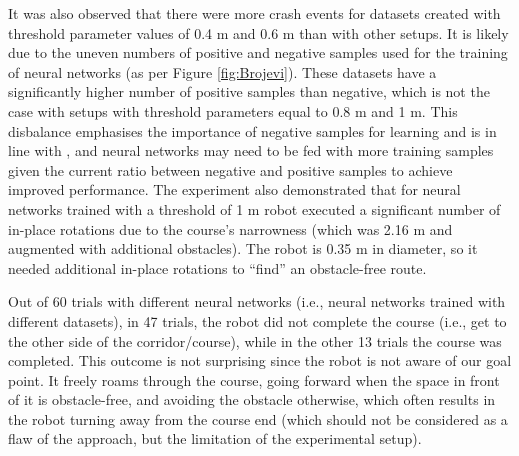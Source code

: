 It was also observed that there were more crash events for datasets created with threshold parameter values of 0.4 m and 0.6 m than with other setups. It is likely due to the uneven numbers of positive and negative samples used for the training of neural networks (as per Figure \ref{fig:Brojevi}). These datasets have a significantly higher number of positive samples than negative, which is not the case with setups with threshold parameters equal to 0.8 m and 1 m. This disbalance emphasises the importance of negative samples for learning and is in line with \cite{Gandhi2017}, and neural networks may need to be fed with more training samples given the current ratio between negative and positive samples to achieve improved performance. The experiment also demonstrated that for neural networks trained with a threshold of  1 m robot executed a significant number of in-place rotations due to the course's narrowness (which was 2.16 m and augmented with additional obstacles). The robot is 0.35 m in diameter, so it needed additional in-place rotations to ``find'' an obstacle-free route.

Out of 60 trials with different neural networks (i.e., neural networks trained with different datasets), in 47 trials, the robot did not complete the course (i.e., get to the other side of the corridor/course), while in the other 13 trials the course was completed. This outcome is not surprising since the robot is not aware of our goal point. It freely roams through the course, going forward when the space in front of it is obstacle-free, and avoiding the obstacle otherwise, which often results in the robot turning away from the course end (which should not be considered as a flaw of the approach, but the limitation of the experimental setup).

